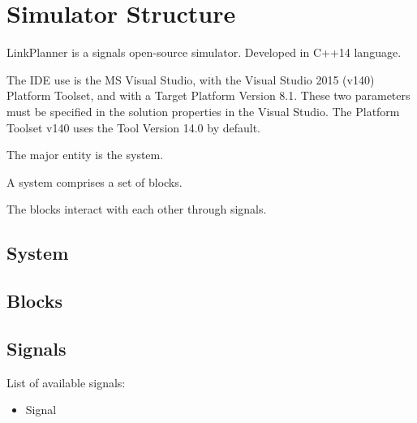
\chapter{Simulator Structure}

LinkPlanner is a signals open-source simulator.
Developed in C++14 language.

The IDE use is the MS Visual Studio, with the Visual Studio 2015 (v140) Platform Toolset, and with a Target Platform Version 8.1.
These two parameters must be specified in the solution properties in the Visual Studio. 
The Platform Toolset v140 uses the Tool Version 14.0 by default.

The major entity is the system.

A system comprises a set of blocks.

The blocks interact with each other through signals.

\section{System}

\section{Blocks}

\section{Signals}

List of available signals:

\begin{itemize}
    \item Signal

\end{itemize}








